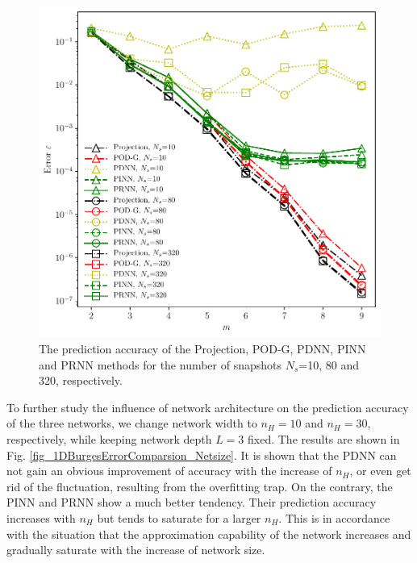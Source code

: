 \documentclass[preprint, 10pt]{elsarticle}
\begin{document}

\begin{figure}[!ht]
  \centering
  \includegraphics[width=12cm]{../../pythonNN/1DBurges/fig/ErrorComparsion_SampleNum.pdf}
\caption{The prediction accuracy of the Projection, POD-G, PDNN, PINN and PRNN methods for the number of snapshots $N_s$=10, 80 and 320, respectively.}
\label{fig_1DBurgesErrorComparsion_SampleNum}
\end{figure}


To further study the influence of network architecture on the prediction accuracy of the three networks, we change network width to $n_H=10$ and $n_H=30$, respectively, while keeping network depth $L=3$ fixed. The results are shown in Fig. \ref{fig_1DBurgesErrorComparsion_Netsize}. It is shown that the PDNN can not gain an obvious improvement of accuracy with the increase of $n_H$, or even get rid of the fluctuation, resulting from the overfitting trap. On the contrary, the PINN and PRNN show a much better tendency. Their prediction accuracy increases with $n_H$ but tends to saturate for a larger $n_H$. This is in accordance with the situation that the approximation capability of the network increases and gradually saturate with the increase of network size.
\end{document}
